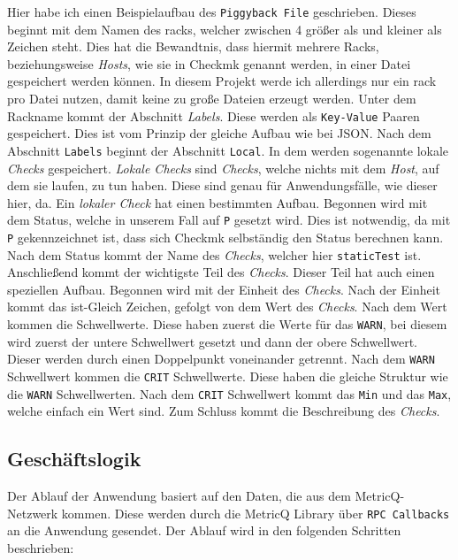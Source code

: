\noindent
Hier habe ich einen Beispielaufbau des \texttt{Piggyback File} geschrieben.
Dieses beginnt mit dem Namen des \Gls{rack}s, welcher zwischen 4 größer als und kleiner als Zeichen steht.
Dies hat die Bewandtnis, dass hiermit mehrere Racks, beziehungsweise \textit{Hosts}, wie sie in \Gls{Checkmk} genannt werden, in einer Datei gespeichert werden können.
In diesem Projekt werde ich allerdings nur ein \Gls{rack} pro Datei nutzen, damit keine zu große Dateien erzeugt werden.
Unter dem Rackname kommt der Abschnitt \textit{Labels}.
Diese werden als \texttt{Key-Value} Paaren gespeichert.
Dies ist vom Prinzip der gleiche Aufbau wie bei \acrshort{JSON}.
Nach dem Abschnitt \texttt{Labels} beginnt der Abschnitt \texttt{Local}.
In dem werden sogenannte lokale \textit{Checks} gespeichert.
\textit{Lokale Checks} sind \textit{Checks}, welche nichts mit dem \textit{Host}, auf dem sie laufen, zu tun haben.
Diese sind genau für Anwendungsfälle, wie dieser hier, da.
Ein \textit{lokaler Check} hat einen bestimmten Aufbau.
Begonnen wird mit dem Status, welche in unserem Fall auf \texttt{P} gesetzt wird.
Dies ist notwendig, da mit \texttt{P} gekennzeichnet ist, dass sich \Gls{Checkmk} selbständig den Status berechnen kann.
Nach dem Status kommt der Name des \textit{Checks}, welcher hier \texttt{staticTest} ist.
Anschließend kommt der wichtigste Teil des \textit{Checks}.
Dieser Teil hat auch einen speziellen Aufbau.
Begonnen wird mit der Einheit des \textit{Checks}.
Nach der Einheit kommt das ist-Gleich Zeichen, gefolgt von dem Wert des \textit{Checks}.
Nach dem Wert kommen die Schwellwerte.
Diese haben zuerst die Werte für das \texttt{WARN}, bei diesem wird zuerst der untere Schwellwert gesetzt und dann der obere Schwellwert.
Dieser werden durch einen Doppelpunkt voneinander getrennt.
Nach dem \texttt{WARN} Schwellwert kommen die \texttt{CRIT} Schwellwerte.
Diese haben die gleiche Struktur wie die \texttt{WARN} Schwellwerten.
Nach dem \texttt{CRIT} Schwellwert kommt das \texttt{Min} und das \texttt{Max}, welche einfach ein Wert sind.
Zum Schluss kommt die Beschreibung des \textit{Checks}.

\subsection{Geschäftslogik}
Der Ablauf der Anwendung basiert auf den Daten, die aus dem \Gls{MetricQ}-Netzwerk kommen. Diese werden durch die \Gls{MetricQ} Library über \texttt{RPC Callbacks} an die Anwendung gesendet. Der Ablauf wird in den folgenden Schritten beschrieben:

